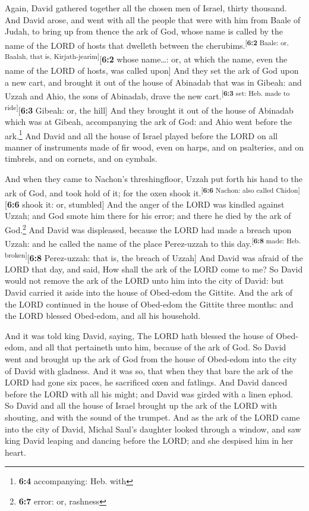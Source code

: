  Again, David gathered together all the chosen men of
Israel, thirty thousand.  And David arose, and went with
all the people that were with him from Baale of Judah, to bring up from
thence the ark of God, whose name is called by the name of the LORD of
hosts that dwelleth between the
cherubims.\textsuperscript{{[}\textbf{6:2} Baale: or, Baalah, that is,
Kirjath-jearim{]}}{[}\textbf{6:2} whose name\ldots: or, at which the
name, even the name of the LORD of hosts, was called upon{]}
 And they set the ark of God upon a new cart, and brought
it out of the house of Abinadab that was in Gibeah: and Uzzah and Ahio,
the sons of Abinadab, drave the new
cart.\textsuperscript{{[}\textbf{6:3} set: Heb. made to
ride{]}}{[}\textbf{6:3} Gibeah: or, the hill{]}  And they
brought it out of the house of Abinadab which was at Gibeah,
accompanying the ark of God: and Ahio went before the ark.\footnote{\textbf{6:4}
  accompanying: Heb. with}  And David and all the house of
Israel played before the LORD on all manner of instruments made of fir
wood, even on harps, and on psalteries, and on timbrels, and on cornets,
and on cymbals.

 And when they came to Nachon's threshingfloor, Uzzah put
forth his hand to the ark of God, and took hold of it; for the oxen
shook it.\textsuperscript{{[}\textbf{6:6} Nachon: also called
Chidon{]}}{[}\textbf{6:6} shook it: or, stumbled{]}  And
the anger of the LORD was kindled against Uzzah; and God smote him there
for his error; and there he died by the ark of God.\footnote{\textbf{6:7}
  error: or, rashness}  And David was displeased, because
the LORD had made a breach upon Uzzah: and he called the name of the
place Perez-uzzah to this day.\textsuperscript{{[}\textbf{6:8} made:
Heb. broken{]}}{[}\textbf{6:8} Perez-uzzah: that is, the breach of
Uzzah{]}  And David was afraid of the LORD that day, and
said, How shall the ark of the LORD come to me?  So David
would not remove the ark of the LORD unto him into the city of David:
but David carried it aside into the house of Obed-edom the Gittite.
 And the ark of the LORD continued in the house of
Obed-edom the Gittite three months: and the LORD blessed Obed-edom, and
all his household.

 And it was told king David, saying, The LORD hath
blessed the house of Obed-edom, and all that pertaineth unto him,
because of the ark of God. So David went and brought up the ark of God
from the house of Obed-edom into the city of David with gladness.
 And it was so, that when they that bare the ark of the
LORD had gone six paces, he sacrificed oxen and fatlings.
 And David danced before the LORD with all his might; and
David was girded with a linen ephod.  So David and all
the house of Israel brought up the ark of the LORD with shouting, and
with the sound of the trumpet.  And as the ark of the
LORD came into the city of David, Michal Saul's daughter looked through
a window, and saw king David leaping and dancing before the LORD; and
she despised him in her heart.

